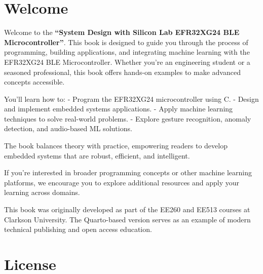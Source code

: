 \documentclass[
  9pt,
  letterpaper,
  abstract,
  titlepage]{scrbook}
\begin{document}

\section*{Welcome}\label{welcome}


Welcome to the \textbf{``System Design with Silicon Lab EFR32XG24 BLE
Microcontroller''}. This book is designed to guide you through the
process of programming, building applications, and integrating machine
learning with the EFR32XG24 BLE Microcontroller. Whether you're an
engineering student or a seasoned professional, this book offers
hands-on examples to make advanced concepts accessible.

You'll learn how to: - Program the EFR32XG24 microcontroller using C. -
Design and implement embedded systems applications. - Apply machine
learning techniques to solve real-world problems. - Explore gesture
recognition, anomaly detection, and audio-based ML solutions.

The book balances theory with practice, empowering readers to develop
embedded systems that are robust, efficient, and intelligent.

If you're interested in broader programming concepts or other machine
learning platforms, we encourage you to explore additional resources and
apply your learning across domains.

\begin{tcolorbox}[enhanced jigsaw, colback=white, breakable, bottomrule=.15mm, opacityback=0, left=2mm, colframe=quarto-callout-note-color-frame, toprule=.15mm, arc=.35mm, rightrule=.15mm, leftrule=.75mm]
\begin{minipage}[t]{5.5mm}
\textcolor{quarto-callout-note-color}{\faInfo}
\end{minipage}%
\begin{minipage}[t]{\textwidth - 5.5mm}

This book was originally developed as part of the EE260 and EE513
courses at Clarkson University. The Quarto-based version serves as an
example of modern technical publishing and open access education.

\end{minipage}%
\end{tcolorbox}

\section*{License}\label{license}
\end{document}
